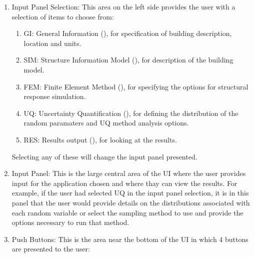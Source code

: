 \begin{enumerate}
\item Input Panel Selection: This area on the left side provides the
  user with a selection of items to choose from:
\begin{enumerate}
  \item GI: General Information (), for specification of building
    description, location and units.
  \item SIM: Structure Information Model (), for description of the
    building model.
  \item FEM: Finite Element Method (), for specifying the options for structural response simulation.
  \item UQ: Uncertainty Quantification (), for defining the distribution
    of the random paramaters and UQ method analysis options.


  \item RES: Results output (), for looking at the results.
\end{enumerate}

Selecting any of these will change the input panel presented.

\item Input Panel: This is the large central area of the UI where the
  user provides input for the application chosen and where thay can view the
  results. For example, if the user had selected UQ in the input panel
  selection, it is in this panel that the user would provide details
  on the distributions associated with each random variable or select
  the sampling method to use and provide the options necessary to run
  that method.

\item Push Buttons: This is the area near the bottom of the UI in
  which 4 buttons are presented to the user:


\end{enumerate}

